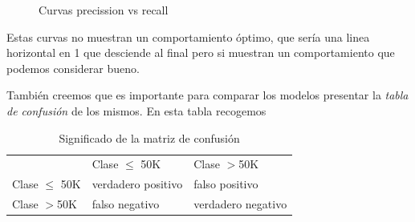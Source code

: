\documentclass[11pt]{article}
\begin{document}
\begin{figure}[H]\centering
    \hfill
    \par 
    \caption{Curvas precission vs recall}
\end{figure}

Estas curvas no muestran un comportamiento óptimo, que sería una linea
horizontal en 1 que desciende al final pero si muestran un comportamiento 
que podemos considerar bueno. 

También creemos que es importante para comparar los modelos presentar la 
\textit{tabla de confusión} de los mismos. En esta tabla recogemos 

\begin{table}[H]
    \centering
    \begin{tabular}{lll}
                          &          Clase $\leq$ 50K        &       Clase $>$50K                \\ \cline{2-3} 
    \multicolumn{1}{l|}{Clase $\leq$ 50K} & \multicolumn{1}{l|}{verdadero positivo} & \multicolumn{1}{l|}{falso positivo} \\ \cline{2-3} 
    \multicolumn{1}{l|}{Clase $>$50K } & \multicolumn{1}{l|}{falso negativo} & \multicolumn{1}{l|}{verdadero negativo} \\ \cline{2-3} 
    \end{tabular}
    \caption{Significado de la matriz de confusión}
\end{table}
\end{document}

